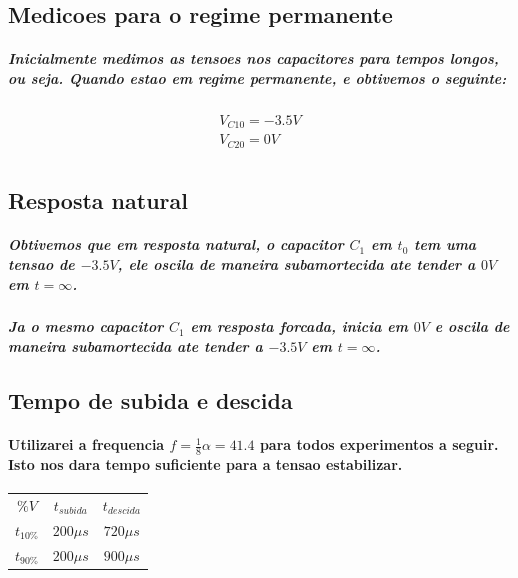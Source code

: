 \documentclass[12pt,twoside, a4paper, twocolumn]{article}
\begin{document}
\subsection{Medicoes para o regime permanente}

\subparagraph*{Inicialmente medimos as tensoes nos capacitores para tempos longos, ou seja. Quando estao em regime permanente, e obtivemos o seguinte:}

\begin{equation*}
    \begin{aligned}
        V_{C10} = -3.5V \\
        V_{C20} = 0V    \\
    \end{aligned}
\end{equation*}

\subsection{Resposta natural}

\subparagraph*{Obtivemos que em resposta natural, o capacitor $C_1$ em $t_0$ tem uma tensao de $-3.5V$, ele oscila de maneira subamortecida ate tender a $0V$ em $t = \infty$.}

\subparagraph*{Ja o mesmo capacitor $C_1$ em resposta forcada, inicia em $0V$ e oscila de maneira subamortecida ate tender a $-3.5V$ em $t = \infty$.}

\subsection{Tempo de subida e descida}

\paragraph*{Utilizarei a frequencia $f = \frac{1}{8} \alpha = 41.4$ para todos experimentos a seguir. Isto nos dara tempo suficiente para a tensao estabilizar.}

\begin{center}
    \begin{tabular}{ |ccc| }
        \hline
        $\%V$      & $t_{subida}$ & $t_{descida}$ \\
        $t_{10\%}$ & $200\mu s$   & $720 \mu s$   \\
        $t_{90\%}$ & $200\mu s$   & $900 \mu s$   \\
        \hline
    \end{tabular}
\end{center}
\end{document}
